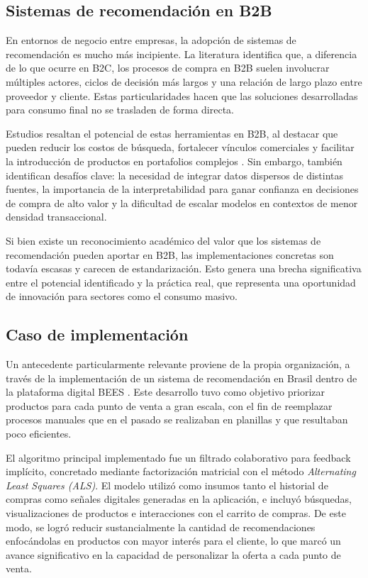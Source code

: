 \subsection{Sistemas de recomendación en B2B}

En entornos de negocio entre empresas, la adopción de sistemas de recomendación es mucho más incipiente. La literatura identifica que, a diferencia de lo que ocurre en B2C, los procesos de compra en B2B suelen involucrar múltiples actores, ciclos de decisión más largos y una relación de largo plazo entre proveedor y cliente. Estas particularidades hacen que las soluciones desarrolladas para consumo final no se trasladen de forma directa.

Estudios resaltan el potencial de estas herramientas en B2B, al destacar que pueden reducir los costos de búsqueda, fortalecer vínculos comerciales y facilitar la introducción de productos en portafolios complejos \cite{ARTICLE:1}. Sin embargo, también identifican desafíos clave: la necesidad de integrar datos dispersos de distintas fuentes, la importancia de la interpretabilidad para ganar confianza en decisiones de compra de alto valor y la dificultad de escalar modelos en contextos de menor densidad transaccional.

Si bien existe un reconocimiento académico del valor que los sistemas de recomendación pueden aportar en B2B, las implementaciones concretas son todavía escasas y carecen de estandarización. Esto genera una brecha significativa entre el potencial identificado y la práctica real, que representa una oportunidad de innovación para sectores como el consumo masivo.

\subsection{Caso de implementación}

Un antecedente particularmente relevante proviene de la propia organización, a través de la implementación de un sistema de recomendación en Brasil dentro de la plataforma digital BEES \cite{REPORT:1}. Este desarrollo tuvo como objetivo priorizar productos para cada punto de venta a gran escala, con el fin de reemplazar procesos manuales que en el pasado se realizaban en planillas y que resultaban poco eficientes.

El algoritmo principal implementado fue un filtrado colaborativo para feedback implícito, concretado mediante factorización matricial con el método \textit{Alternating Least Squares (ALS)}. El modelo utilizó como insumos tanto el historial de compras como señales digitales generadas en la aplicación, e incluyó búsquedas, visualizaciones de productos e interacciones con el carrito de compras. De este modo, se logró reducir sustancialmente la cantidad de recomendaciones enfocándolas en productos con mayor interés para el cliente, lo que marcó un avance significativo en la capacidad de personalizar la oferta a cada punto de venta.

